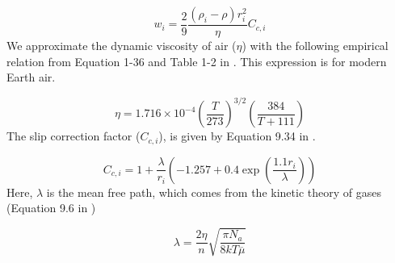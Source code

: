 \documentclass{article}
\begin{document}
\begin{equation} \label{eq:stokes_law}
  w_i = \frac{2}{9} \frac{(\rho_i - \rho)r_i^2}{\eta} C_{c,i}
\end{equation}
We approximate the dynamic viscosity of air ($\eta$) with the following empirical relation from Equation 1-36 and Table 1-2 in \cite{White_2006}. This expression is for modern Earth air.

\begin{equation} \label{eq:dynamic_viscosity}
  \eta = 1.716 \times 10^{-4} \left(\frac{T}{273}\right)^{3/2} \left( \frac{384}{T + 111} \right)
\end{equation}
The slip correction factor ($C_{c,i}$), is given by Equation 9.34 in \cite{Seinfeld_2006}.

\begin{equation} \label{eq:slip_correction}
  C_{c,i} = 1 + \frac{\lambda}{r_i}\left( -1.257 + 0.4 \exp \left(\frac{1.1 r_i}{\lambda}\right) \right)
\end{equation}
Here, $\lambda$ is the mean free path, which comes from the kinetic theory of gases (Equation 9.6 in \cite{Seinfeld_2006})

\begin{equation}
  \lambda = \frac{2 \eta}{n} \sqrt{\frac{\pi N_a}{8 k T \overline{\mu}}}
\end{equation}





\end{document}
